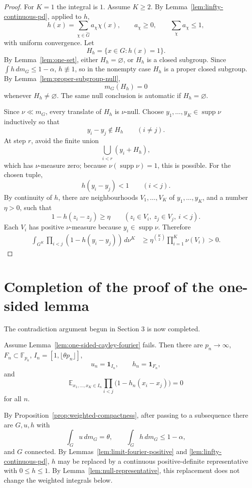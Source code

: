 \documentclass[11pt]{article}
\numberwithin{equation}{section}
\newcommand{\E}{\mathbb E}
\newcommand{\F}{\mathbb F}
\newcommand{\1}{\mathbf 1}
\newcommand{\supp}{\operatorname{supp}}
\begin{document}
\begin{proof}
For \(K=1\) the integral is \(1\).  Assume \(K\ge2\).
By Lemma~\ref{lem:linfty-continuous-pd}, applied to \(h\),
\[
        h(x)=\sum_{\chi\in\widehat G}a_\chi\chi(x),
        \qquad
        a_\chi\ge0,
        \qquad
        \sum_\chi a_\chi\le1,
\]
with uniform convergence.  Let
\[
        H_h=\{x\in G:h(x)=1\}.
\]
By Lemma~\ref{lem:one-set}, either \(H_h=\varnothing\), or \(H_h\) is a
closed subgroup.  Since \(\int h\,dm_G\le1-\alpha\), \(h\not\equiv1\), so
in the nonempty case \(H_h\) is a proper closed subgroup.  By
Lemma~\ref{lem:proper-subgroup-null},
\[
        m_G(H_h)=0
\]
whenever \(H_h\ne\varnothing\).  The same null conclusion is automatic if
\(H_h=\varnothing\).

Since \(\nu\ll m_G\), every translate of \(H_h\) is \(\nu\)-null.  Choose
\(y_1,\ldots,y_K\in\supp\nu\) inductively so that
\[
        y_i-y_j\notin H_h
        \qquad(i\ne j).
\]
At step \(r\), avoid the finite union
\[
        \bigcup_{i<r}(y_i+H_h),
\]
which has \(\nu\)-measure zero; because \(\nu(\supp\nu)=1\), this is
possible.  For the chosen tuple,
\[
        h(y_i-y_j)<1
        \qquad(i<j).
\]
By continuity of \(h\), there are neighbourhoods
\(V_1,\ldots,V_K\) of \(y_1,
\ldots,y_K\), and a number \(\eta>0\), such that
\[
        1-h(z_i-z_j)\ge\eta
        \qquad
        (z_i\in V_i,
        \ z_j\in V_j,
        \ i<j).
\]
Each \(V_i\) has positive \(\nu\)-measure because \(y_i\in\supp\nu\).
Therefore
\[
\begin{aligned}
        \int_{G^K}
        \prod_{i<j}(1-h(y_i-y_j))\,d\nu^K
        &\ge
        \eta^{\binom K2}\prod_{i=1}^K\nu(V_i)>0.
\end{aligned}
\]
\end{proof}

\section{Completion of the proof of the one-sided lemma}

The contradiction argument begun in Section 3 is now completed.

Assume Lemma~\ref{lem:one-sided-cayley-fourier} fails.  Then there are
\(p_n\to\infty\), \(F_n\subset\F_{p_n}\),
\(I_n=[1,\lfloor\theta p_n\rfloor]\),
\[
        u_n=\1_{I_n},
        \qquad
        h_n=\1_{F_n},
\]
and
\[
        \E_{x_1,\ldots,x_K\in I_n}
        \prod_{i<j}
        \bigl(1-h_n(x_i-x_j)\bigr)=0
\]
for all \(n\).

By Proposition~\ref{prop:weighted-compactness}, after passing to a
subsequence there are \(G,u,h\) with
\[
        \int_G u\,dm_G=\theta,
        \qquad
        \int_G h\,dm_G\le1-\alpha,
\]
and \(G\) connected.  By Lemmas~\ref{lem:limit-fourier-positive} and
\ref{lem:linfty-continuous-pd}, \(h\) may be replaced by a continuous
positive-definite representative with \(0\le h\le1\).  By
Lemma~\ref{lem:null-representative}, this replacement does not change the
weighted integrals below.
\end{document}
